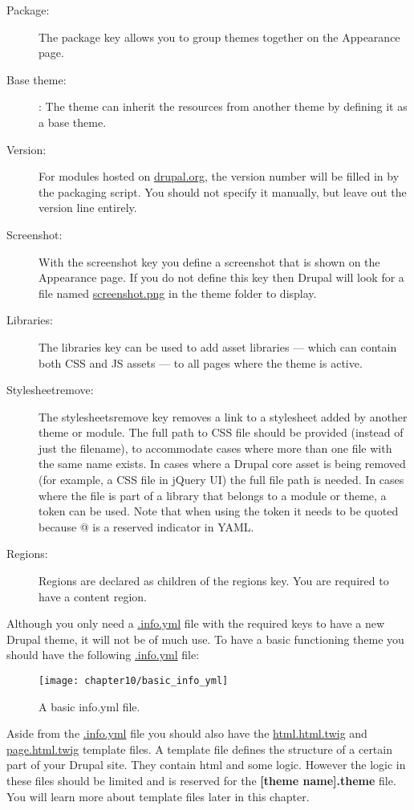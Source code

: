 \begin{description}
	\item[Package:] The package key allows you to group themes together on the Appearance page.
	\item[Base theme:] : The theme can inherit the resources from another theme by defining it as a base theme.
	\item[Version:] For modules hosted on \url{drupal.org}, the version number will be filled in by the packaging script. You should not specify it manually, but leave out the version line entirely.
	\item[Screenshot:] With the screenshot key you define a screenshot that is shown on the	Appearance page. If you do not define this key then Drupal will look for a file named \url{screenshot.png} in the theme folder to display.
	\item[Libraries:] The libraries key can be used to add asset libraries — which can contain both CSS and JS assets — to all pages where the theme is active.
	\item[Stylesheet­remove:] The stylesheets­remove key removes a link to a stylesheet added by another theme or module. The full path to CSS file should be provided (instead of just the filename), to accommodate cases where more than one file with the same name exists. In cases where a Drupal core asset is being removed (for example, a CSS file in jQuery UI) the full file path is needed. In cases where the file is part of a library that belongs to a module or theme, a token can be used. Note that when using the token it needs to be quoted because @ is a reserved indicator in YAML.
	\item[Regions:] Regions are declared as children of the regions key. You are required to have a content region.
\end{description}

Although you only need a \url{.info.yml} file with the required keys to have a new Drupal theme, it will not be of much use. To have a basic functioning theme you should have the following \url{.info.yml} file:

\begin{figure}[H]
	\centering
	\texttt{[image: chapter10/basic\_info\_yml]}
	\caption{A basic info.yml file.}
	\label{fig:basic_info_yml}
\end{figure}

Aside from the \url{.info.yml} file you should also have the \url{html.html.twig} and \url{page.html.twig} template files. A template file defines the structure of a certain part of your Drupal site. They contain html and some logic. However the logic in these files should be limited and is reserved for the \textbf{[theme name].theme} file. You will learn more about template files later in this chapter.


